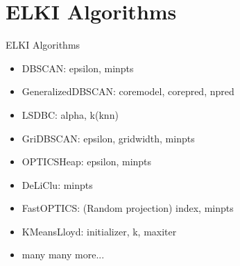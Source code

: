 \documentclass{beamer}
\begin{document}
\section{ELKI Algorithms}

\begin{frame}{ELKI Algorithms}
\begin{itemize}
\item DBSCAN: epsilon, minpts 
\item GeneralizedDBSCAN: coremodel, corepred, npred 
\item LSDBC: alpha, k(knn)
\item GriDBSCAN: epsilon, gridwidth, minpts
\item OPTICSHeap: epsilon, minpts
\item DeLiClu: minpts
\item FastOPTICS: (Random projection) index, minpts
\item KMeansLloyd: initializer, k, maxiter
\item many many more... \cite{clusterAlgorithms}

\end{itemize}

\end{frame}



\end{document}
